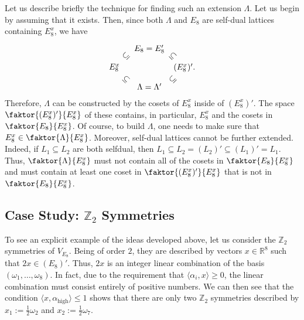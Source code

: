 \documentclass{article}
\begin{document}
Let us describe briefly the technique for finding such an extension $\Lambda$. Let us begin by assuming that it exists. Then, since both $\Lambda$ and $E_8$ are self-dual lattices containing $E_8^x$, we have
\begin{equation}
\begin{tikzpicture}
\node at (-1,0) {$E_8^x$};
\node at (-0.5,0.5) {\rotatebox{45}{$\subseteq$}};
\node at (-0.5,-0.5) {\rotatebox{-45}{$\subseteq$}};
\node at (0.5,0.8) {$E_8=E_8'$};
\node at (0.5,-0.8) {$\Lambda=\Lambda'$};
\node at (1.5,-0.5) {\rotatebox{45}{$\subseteq$}};
\node at (1.5,0.5) {\rotatebox{-45}{$\subseteq$}};
\node at (2,0) {$(E_8^x)'$.};
\end{tikzpicture}
\end{equation}
Therefore, $\Lambda$ can be constructed by  the cosets of $E_8^x$ inside of $(E_8^x)'$. The space $\faktor{(E_8^x)'}{E_8^x}$ of these contains, in particular, $E_8^x$ and the cosets in $\faktor{E_8}{E_8^x}$. Of course, to build $\Lambda$, one needs to make sure that $E_8^x\in\faktor{\Lambda}{E_8^x}$. Moreover, self-dual lattices cannot be further extended. Indeed, if $L_1\subseteq L_2$ are both selfdual, then $L_1\subseteq L_2=(L_2)'\subseteq(L_1)'=L_1$. Thus, $\faktor{\Lambda}{E_8^x}$ must not contain all of the cosets in $ \faktor{E_8}{E_8^x}$ and must contain at least one coset in $\faktor{(E_8^x)'}{E_8^x}$ that is not in $\faktor{E_8}{E_8^x}$.

\subsection{Case Study: \texorpdfstring{$\mathbb{Z}_2$}{Z2} Symmetries}

To see an explicit example of the ideas developed above, let us consider the $\mathbb{Z}_2$ symmetries of $V_{E_8}$. Being of order $2$, they are described by vectors $x\in\mathbb{R}^8$ such that $2x\in(E_8)'$. Thus, $2x$ is an integer linear combination of the basis $(\omega_1,\dots,\omega_8)$. In fact, due to the requirement that $\langle \alpha_i,x\rangle\geq 0$, the linear combination must consist entirely of positive numbers. We can then see that the condition $\langle x,\alpha_{\text{high}}\rangle\leq 1$ shows that there are only two $\mathbb{Z}_2$ symmetries described by $x_1:=\frac{1}{2}\omega_2$ and $x_2:=\frac{1}{2}\omega_7$.
\end{document}
